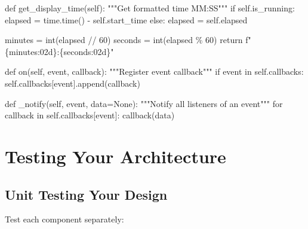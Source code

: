 \documentclass[
  letterpaper,
  DIV=11,
  numbers=noendperiod,
  oneside]{scrreprt}
\newenvironment{Shaded}{}{}
\newcommand{\BuiltInTok}[1]{\textcolor[rgb]{0.84,0.23,0.29}{#1}}
\newcommand{\CommentTok}[1]{\textcolor[rgb]{0.42,0.45,0.49}{#1}}
\newcommand{\ControlFlowTok}[1]{\textcolor[rgb]{0.84,0.23,0.29}{#1}}
\newcommand{\DecValTok}[1]{\textcolor[rgb]{0.00,0.36,0.77}{#1}}
\newcommand{\KeywordTok}[1]{\textcolor[rgb]{0.84,0.23,0.29}{#1}}
\newcommand{\NormalTok}[1]{\textcolor[rgb]{0.14,0.16,0.18}{#1}}
\newcommand{\OperatorTok}[1]{\textcolor[rgb]{0.14,0.16,0.18}{#1}}
\newcommand{\SpecialCharTok}[1]{\textcolor[rgb]{0.00,0.36,0.77}{#1}}
\newcommand{\SpecialStringTok}[1]{\textcolor[rgb]{0.01,0.18,0.38}{#1}}
\newcommand{\VariableTok}[1]{\textcolor[rgb]{0.89,0.38,0.04}{#1}}
\begin{document}
\begin{Shaded}
\begin{Highlighting}[]
    \KeywordTok{def}\NormalTok{ get\_display\_time(}\VariableTok{self}\NormalTok{):}
        \CommentTok{"""Get formatted time MM:SS"""}
        \ControlFlowTok{if} \VariableTok{self}\NormalTok{.is\_running:}
\NormalTok{            elapsed }\OperatorTok{=}\NormalTok{ time.time() }\OperatorTok{{-}} \VariableTok{self}\NormalTok{.start\_time}
        \ControlFlowTok{else}\NormalTok{:}
\NormalTok{            elapsed }\OperatorTok{=} \VariableTok{self}\NormalTok{.elapsed}
            
\NormalTok{        minutes }\OperatorTok{=} \BuiltInTok{int}\NormalTok{(elapsed }\OperatorTok{//} \DecValTok{60}\NormalTok{)}
\NormalTok{        seconds }\OperatorTok{=} \BuiltInTok{int}\NormalTok{(elapsed }\OperatorTok{\%} \DecValTok{60}\NormalTok{)}
        \ControlFlowTok{return} \SpecialStringTok{f"}\SpecialCharTok{\{}\NormalTok{minutes}\SpecialCharTok{:02d\}}\SpecialStringTok{:}\SpecialCharTok{\{}\NormalTok{seconds}\SpecialCharTok{:02d\}}\SpecialStringTok{"}
    
    \KeywordTok{def}\NormalTok{ on(}\VariableTok{self}\NormalTok{, event, callback):}
        \CommentTok{"""Register event callback"""}
        \ControlFlowTok{if}\NormalTok{ event }\KeywordTok{in} \VariableTok{self}\NormalTok{.callbacks:}
            \VariableTok{self}\NormalTok{.callbacks[event].append(callback)}
    
    \KeywordTok{def}\NormalTok{ \_notify(}\VariableTok{self}\NormalTok{, event, data}\OperatorTok{=}\VariableTok{None}\NormalTok{):}
        \CommentTok{"""Notify all listeners of an event"""}
        \ControlFlowTok{for}\NormalTok{ callback }\KeywordTok{in} \VariableTok{self}\NormalTok{.callbacks[event]:}
\NormalTok{            callback(data)}
\end{Highlighting}
\end{Shaded}

\section{Testing Your Architecture}\label{testing-your-architecture}

\subsection{Unit Testing Your Design}\label{unit-testing-your-design}

Test each component separately:
\end{document}
